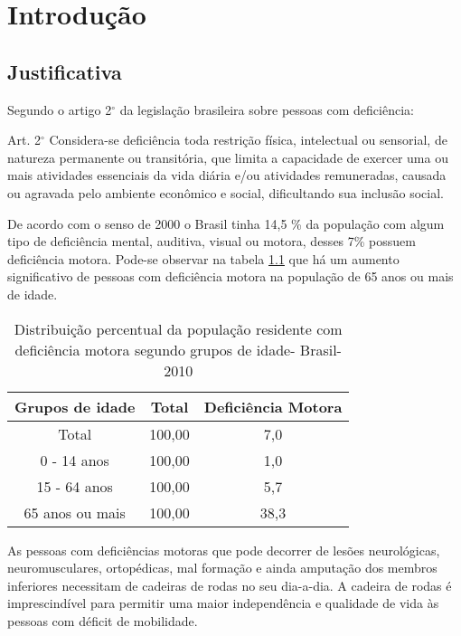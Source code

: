 \chapter[Introdução]{Introdução}

\section{Justificativa}
Segundo o artigo 2$^{\circ}$ da legislação brasileira sobre pessoas com deficiência:
\begin{citacao}
Art. 2$^{\circ}$ Considera-se deficiência toda restrição física, intelectual ou sensorial, de natureza permanente ou transitória, que limita a capacidade de exercer uma ou mais atividades essenciais da vida diária e/ou atividades remuneradas, causada ou agravada pelo ambiente econômico e social, dificultando sua inclusão social.
\end{citacao}
  
De acordo com o senso de 2000 o Brasil tinha 14,5 \% da população com algum tipo de deficiência mental, auditiva, visual ou motora, desses 7\% possuem deficiência motora.  Pode-se observar na tabela \ref{tab:ibge} que há um aumento significativo de pessoas com deficiência motora na população de 65 anos ou mais de idade.

\begin{table}[ht!]
\centering
\caption{Distribuição percentual da população residente com deficiência motora segundo grupos de idade- Brasil-2010}
\begin{tabular}{|c|c|c|}
\hline
Grupos de idade & Total  & Deficiência Motora \\ \hline

Total           & 100,00 & 7,0                \\ \hline
0 - 14 anos       & 100,00 & 1,0                \\ \hline
15 - 64 anos    & 100,00 & 5,7                \\ \hline
65 anos ou mais & 100,00 & 38,3              \\ \hline

\end{tabular}
\label{tab:ibge}
\end{table}

As pessoas com deficiências motoras que pode decorrer de lesões neurológicas, neuromusculares, ortopédicas, mal formação e ainda amputação dos membros inferiores necessitam de cadeiras de rodas no seu dia-a-dia. A cadeira de rodas é imprescindível para permitir uma maior independência e qualidade de vida às pessoas com déficit de mobilidade. \cite{relatorio_sus}

